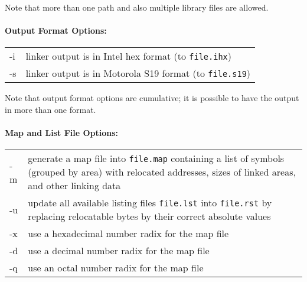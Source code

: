 \documentclass[10pt]{article}
\newcommand{\code}[1]{{\lstset{basicstyle=\normalsize\ttfamily}\lstinline!#1!}}
\newenvironment{optionList}{\begin{center}\begin{tabular}{p{4cm}p{8cm}}}%
                           {\end{tabular}\end{center}}
\begin{document}
Note that more than one path and also multiple library files are allowed.


\paragraph{Output Format Options:}
  \begin{optionList}
    -i & linker output is in Intel hex format (to \code{file.ihx})\\
    -s & linker output is in Motorola S19 format (to \code{file.s19})
  \end{optionList}

Note that output format options are cumulative; it is possible to have
the output in more than one format.


\paragraph{Map and List File Options:}
  \begin{optionList}
    -m & generate a map file into \code{file.map} containing a list of
         symbols (grouped by area) with relocated addresses, sizes of
         linked areas, and other linking data\\

    -u & update all available listing files \code{file.lst} into
         \code{file.rst} by replacing relocatable bytes by their
         correct absolute values\\

    -x & use a hexadecimal number radix for the map file\\
    -d & use a decimal number radix for the map file\\
    -q & use an octal number radix for the map file
  \end{optionList}


\end{document}
